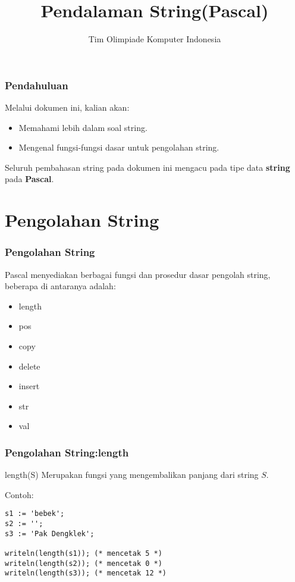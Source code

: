 \documentclass{beamer}
\title{Pendalaman String\newline (Pascal)}
\author{Tim Olimpiade Komputer Indonesia}
\date{}
\begin{document}
\begin{frame}
\titlepage
\end{frame}

\begin{frame}
\frametitle{Pendahuluan}
Melalui dokumen ini, kalian akan:
\begin{itemize}
    \item Memahami lebih dalam soal string.
    \item Mengenal fungsi-fungsi dasar untuk pengolahan string.
\end{itemize}
\vfill
Seluruh pembahasan string pada dokumen ini mengacu pada tipe data \textbf{string} pada \textbf{Pascal}.
\end{frame}

\section{Pengolahan String}
\frame{\sectionpage}

\begin{frame}
\frametitle{Pengolahan String}
Pascal menyediakan berbagai fungsi dan prosedur dasar pengolah string, beberapa di antaranya adalah:
\begin{itemize}
    \item length
    \item pos
    \item copy
    \item delete
    \item insert
    \item str
    \item val
\end{itemize}
\end{frame}

\begin{frame}[fragile]
\frametitle{Pengolahan String:\newline length}
\begin{block}{length(S)}
Merupakan fungsi yang mengembalikan panjang dari string $S$.
\end{block}

Contoh:
\begin{lstlisting}
s1 := 'bebek';
s2 := '';
s3 := 'Pak Dengklek';

writeln(length(s1)); (* mencetak 5 *)
writeln(length(s2)); (* mencetak 0 *)
writeln(length(s3)); (* mencetak 12 *)
\end{lstlisting}
\end{frame}
\end{document}
